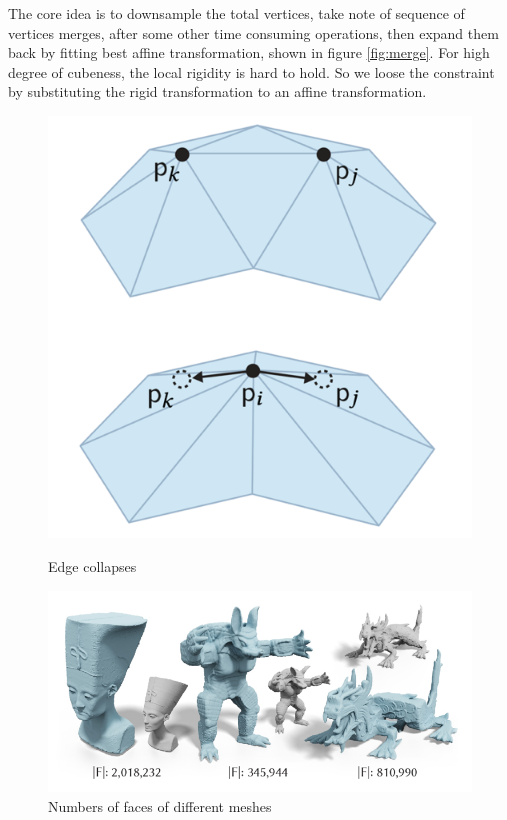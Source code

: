 \documentclass[a4paper,10pt]{article}
\begin{document}
The core idea is to downsample the total vertices, take note of sequence of vertices merges, after some other time consuming operations, then expand them back by fitting best affine transformation, shown in figure \ref{fig:merge}. For high degree of cubeness, the local rigidity is hard to hold. So we loose the constraint by substituting the rigid transformation to an affine transformation.
	\begin{figure}[ht!]
		\centering
		\begin{minipage}[t]{.3\textwidth}
			  \centering
			  \includegraphics[width=\linewidth]{figures/merge_split}
			  \caption{Edge collapses}
			  \label{fig:merge}
		\end{minipage}%
		\begin{minipage}[t]{.65\textwidth}
			  \centering
			  \includegraphics[width=0.9\linewidth]{figures/face}
			  \caption{Numbers of faces of different meshes}
			  \label{fig:faces}
		\end{minipage}
	\end{figure}
\end{document}
